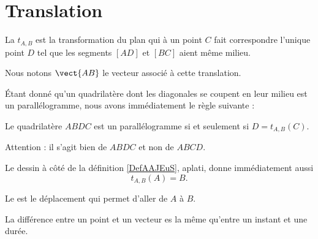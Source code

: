 

\section{Translation}

\begin{multicols}{2}
    \begin{definition}  \label{DefAAJEuS}
    La  \( t_{A,B}\) est la transformation du plan qui à un point \( C\) fait correspondre l'unique point \( D\) tel que les segments \( [AD]\) et \( [BC]\) aient même milieu.
\end{definition}

\columnbreak


\end{multicols}
Nous notons \( \vect{ AB }\) le vecteur associé à cette translation.

Étant donné qu'un quadrilatère dont les diagonales se coupent en leur milieu est un parallélogramme, nous avons immédiatement le règle suivante :
\begin{Aretenir}
    Le quadrilatère \( ABDC\) est un parallélogramme si et seulement si \( D=t_{A,B}(C)\).

Attention : il s'agit bien de \( ABDC\) et non de \( ABCD\).
\end{Aretenir}

Le dessin à côté de la définition \ref{DefAAJEuS}, aplati, donne immédiatement aussi
\begin{equation}
    t_{A,B}(A)=B.
\end{equation}

\begin{definition}
    Le   est le déplacement qui permet d'aller de $A$ à \( B\).
\end{definition}
La différence entre un point et un vecteur es la même qu'entre un instant et une durée.

